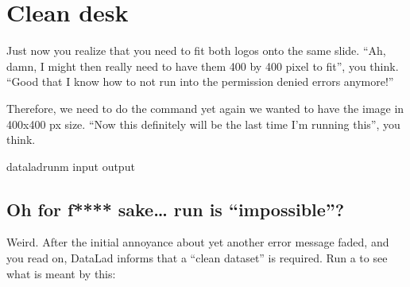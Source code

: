 \sphinxstepscope

\ignorespaces 

\section{Clean desk}
\label{\detokenize{basics/101-112-run4:clean-desk}}\label{\detokenize{basics/101-112-run4:run5}}\label{\detokenize{basics/101-112-run4:index-0}}\label{\detokenize{basics/101-112-run4::doc}}
\sphinxAtStartPar
Just now you realize that you need to fit both logos onto the same slide.
“Ah, damn, I might then really need to have them 400 by 400 pixel to fit”,
you think. “Good that I know how to not run into the permission denied errors anymore!”

\sphinxAtStartPar
Therefore, we need to do the  command yet again \sphinxhyphen{} we wanted to have
the image in 400x400 px size. “Now this definitely will be the last time I’m running this”,
you think.

%
\begin{sphinxVerbatim}[commandchars=\\\{\}]
dataladrun\PYGZhy{}m
\PYGZhy{}\PYGZhy{}input
\PYGZhy{}\PYGZhy{}output
\end{sphinxVerbatim}
\sphinxresetverbatimhllines


\subsection{Oh for f**** sake… run is “impossible”?}
\label{\detokenize{basics/101-112-run4:oh-for-f-sake-run-is-impossible}}
\sphinxAtStartPar
Weird. After the initial annoyance about yet another error message faded,
and you read on,
DataLad informs that a “clean dataset” is required.
Run a  to see what is meant by this:

